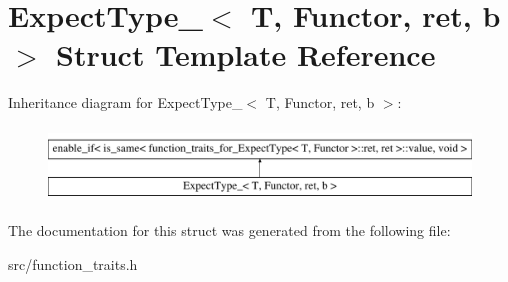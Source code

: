 \hypertarget{struct_expect_type__}{\section{Expect\-Type\-\_\-$<$ T, Functor, ret, b $>$ Struct Template Reference}
\label{struct_expect_type__}
}
Inheritance diagram for Expect\-Type\-\_\-$<$ T, Functor, ret, b $>$\-:\begin{figure}[H]
\begin{center}
\leavevmode
\includegraphics[height=2.000000cm]{struct_expect_type__}
\end{center}
\end{figure}


The documentation for this struct was generated from the following file\-:\begin{DoxyCompactItemize}
\item 
src/function\-\_\-traits.\-h\end{DoxyCompactItemize}
